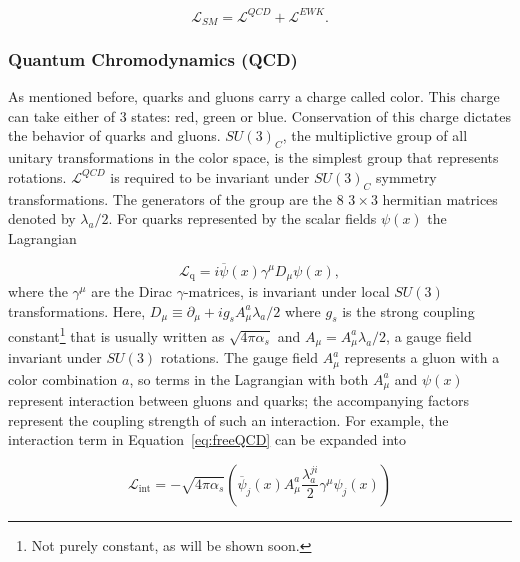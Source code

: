 \begin{equation}
\mathcal{L}_{SM} = \mathcal{L}^{QCD} + \mathcal{L}^{EWK}.
\end{equation} 
  
\subsubsection{Quantum Chromodynamics (QCD)}
\label{sec:qcdTheory}
\par As mentioned before, quarks and gluons carry a charge called color. This charge can take 
either of 3 states: red, green or blue. Conservation 
of this charge dictates the behavior of quarks and gluons. $SU(3)_C$, the multiplictive group of 
all unitary transformations in the color space, is the simplest group that represents rotations. 
$\mathcal{L}^{QCD}$ is required to be invariant under $SU(3)_C$ symmetry transformations. 
The generators of the group are the 8 $3\times 3$ hermitian matrices denoted by $\lambda_a/2$. 
%
For quarks represented by the scalar fields $\psi(x)$ the Lagrangian  

\begin{equation}
\mathcal{L}_{\text{q}} = i\overline{\psi}(x)\gamma^{\mu}D_\mu\psi(x), 
\label{eq:freeQCD}
\end{equation}
where the $\gamma^{\mu}$ are the Dirac $\gamma$-matrices, is invariant under local $SU(3)$ transformations. Here,
 $D_\mu \equiv\partial_\mu + ig_{s}A_\mu^a\lambda_a/2$ where $g_{s}$ is the 
strong coupling constant\footnote{Not purely constant, as will be shown soon.}
 that is usually written as $\sqrt{4\pi\alpha_{s}}$ and $A_\mu = A_\mu^a\lambda_a/2$, a gauge field  
invariant under $SU(3)$ rotations. The gauge field $A_\mu^a$ represents a gluon with a color 
combination $a$, so terms in the Lagrangian with 
both $A_\mu^a$ and $\psi(x)$ represent 
interaction between gluons and quarks; the accompanying factors represent the coupling 
strength of such an interaction. For example, the interaction term in Equation~\ref{eq:freeQCD} can be expanded into 

\begin{equation}
\mathcal{L}_{\text{int}} = -\sqrt{4\pi\alpha_s}\left (\overline{\psi}_j(x)A_\mu^a\frac{\lambda^{ji}_a}{2}\gamma^\mu\psi_j(x)\right ) 
\end{equation}

